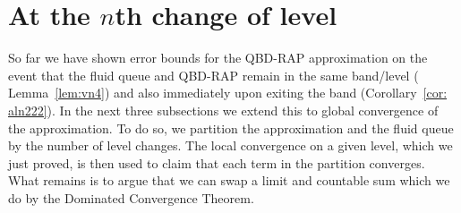 %
%
%
%
%


\section{At the \(n\)th change of level}\label{sec: nth change}

So far we have shown error bounds for the QBD-RAP approximation on the event that the fluid queue and QBD-RAP remain in the same band/level (%
Lemma~\ref{lem:vn4}) and also immediately upon exiting the band (Corollary~\ref{cor: aln222}). In the next three subsections we extend this to global convergence of the approximation. To do so, we partition the approximation and the fluid queue by the number of level changes. The local convergence on a given level, which we just proved, is then used to claim that each term in the partition converges. What remains is to argue that we can swap a limit and countable sum which we do by the Dominated Convergence Theorem. 


